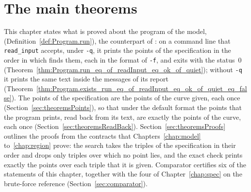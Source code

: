 \chapter{The main theorems}\label{chap:theorems}

This chapter states what is proved about the program of the model, 
(Definition~\ref{def:Program.run}), the counterpart of \jpoints{}: on a command line that
\texttt{read\_input} accepts, under \texttt{-q}, it prints the points of the specification in the
order in which \jpoints{} finds them, each in the format of \texttt{-f}, and exits with the
status~$0$ (Theorem~\ref{thm:Program.run_eq_of_readInput_eq_ok_of_quiet}); without \texttt{-q} it
prints the same text inside the messages of its report
(Theorem~\ref{thm:Program.exists_run_eq_of_readInput_eq_ok_of_quiet_eq_false}). The points of the
specification are the points of the curve given, each once (Section~\ref{sec:theoremsPoints}), so
that under the default format the points that the program prints, read back from its text, are
exactly the points of the curve, each once (Section~\ref{sec:theoremsReadBack}).
Section~\ref{sec:theoremsProofs} outlines the proofs from the contracts that
Chapters~\ref{chap:model} to~\ref{chap:region} prove: the search takes the triples of the
specification in their order and drops only triples over which no point lies, and the exact check
prints exactly the points over each triple that it is given. Comparator certifies six of the
statements of this chapter, together with the four of Chapter~\ref{chap:spec} on the brute-force
reference (Section~\ref{sec:comparator}).

